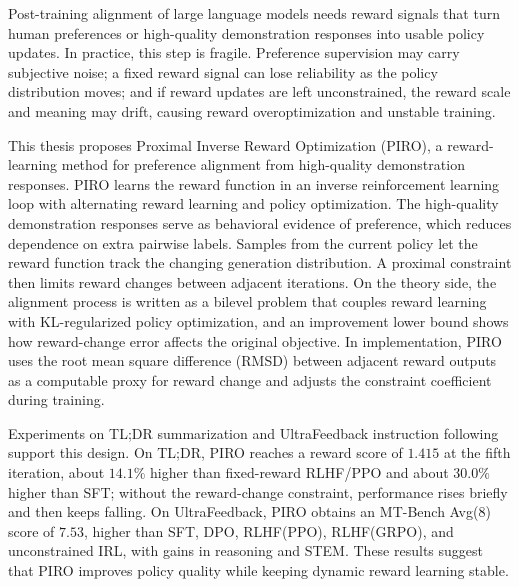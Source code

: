 \begin{engabstract}
Post-training alignment of large language models needs reward signals that turn human preferences or high-quality demonstration responses into usable policy updates. In practice, this step is fragile. Preference supervision may carry subjective noise; a fixed reward signal can lose reliability as the policy distribution moves; and if reward updates are left unconstrained, the reward scale and meaning may drift, causing reward overoptimization and unstable training.

This thesis proposes Proximal Inverse Reward Optimization (PIRO), a reward-learning method for preference alignment from high-quality demonstration responses. PIRO learns the reward function in an inverse reinforcement learning loop with alternating reward learning and policy optimization. The high-quality demonstration responses serve as behavioral evidence of preference, which reduces dependence on extra pairwise labels. Samples from the current policy let the reward function track the changing generation distribution. A proximal constraint then limits reward changes between adjacent iterations. On the theory side, the alignment process is written as a bilevel problem that couples reward learning with KL-regularized policy optimization, and an improvement lower bound shows how reward-change error affects the original objective. In implementation, PIRO uses the root mean square difference (RMSD) between adjacent reward outputs as a computable proxy for reward change and adjusts the constraint coefficient during training.

Experiments on TL;DR summarization and UltraFeedback instruction following support this design. On TL;DR, PIRO reaches a reward score of $1.415$ at the fifth iteration, about $14.1\%$ higher than fixed-reward RLHF/PPO and about $30.0\%$ higher than SFT; without the reward-change constraint, performance rises briefly and then keeps falling. On UltraFeedback, PIRO obtains an MT-Bench Avg(8) score of $7.53$, higher than SFT, DPO, RLHF(PPO), RLHF(GRPO), and unconstrained IRL, with gains in reasoning and STEM. These results suggest that PIRO improves policy quality while keeping dynamic reward learning stable.

\end{engabstract}
